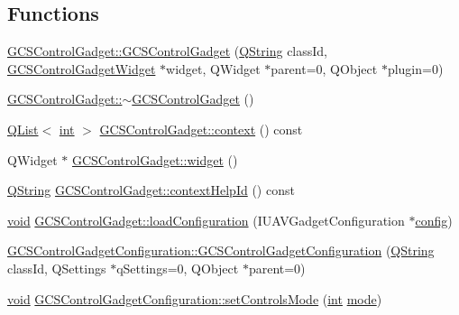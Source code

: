 \subsection*{Functions}
\begin{DoxyCompactItemize}
\item 
\hyperlink{group___g_c_s_control_gadget_plugin_gaa2bb4808899771140d27bd47b54ccb8c}{G\-C\-S\-Control\-Gadget\-::\-G\-C\-S\-Control\-Gadget} (\hyperlink{group___u_a_v_objects_plugin_gab9d252f49c333c94a72f97ce3105a32d}{Q\-String} class\-Id, \hyperlink{class_g_c_s_control_gadget_widget}{G\-C\-S\-Control\-Gadget\-Widget} $\ast$widget, Q\-Widget $\ast$parent=0, Q\-Object $\ast$plugin=0)
\item 
\hyperlink{group___g_c_s_control_gadget_plugin_ga109d324fea74699d89e95ea779cd7c18}{G\-C\-S\-Control\-Gadget\-::$\sim$\-G\-C\-S\-Control\-Gadget} ()
\item 
\hyperlink{class_q_list}{Q\-List}$<$ \hyperlink{ioapi_8h_a787fa3cf048117ba7123753c1e74fcd6}{int} $>$ \hyperlink{group___g_c_s_control_gadget_plugin_gaebdfdbcaa43f61addf35752163d359d7}{G\-C\-S\-Control\-Gadget\-::context} () const 
\item 
Q\-Widget $\ast$ \hyperlink{group___g_c_s_control_gadget_plugin_ga36c99e15ded265f21ddeb3b0ef9a344f}{G\-C\-S\-Control\-Gadget\-::widget} ()
\item 
\hyperlink{group___u_a_v_objects_plugin_gab9d252f49c333c94a72f97ce3105a32d}{Q\-String} \hyperlink{group___g_c_s_control_gadget_plugin_ga5be6c84c2994367f7f86e3553cf68b19}{G\-C\-S\-Control\-Gadget\-::context\-Help\-Id} () const 
\item 
\hyperlink{group___u_a_v_objects_plugin_ga444cf2ff3f0ecbe028adce838d373f5c}{void} \hyperlink{group___g_c_s_control_gadget_plugin_ga439722d2b4016bbfaad9486b20c35a1a}{G\-C\-S\-Control\-Gadget\-::load\-Configuration} (I\-U\-A\-V\-Gadget\-Configuration $\ast$\hyperlink{deflate_8c_a4473b5227787415097004fd39f55185e}{config})
\item 
\hyperlink{group___g_c_s_control_gadget_plugin_ga564a596fece84d06f7a2ff0f9151d140}{G\-C\-S\-Control\-Gadget\-Configuration\-::\-G\-C\-S\-Control\-Gadget\-Configuration} (\hyperlink{group___u_a_v_objects_plugin_gab9d252f49c333c94a72f97ce3105a32d}{Q\-String} class\-Id, Q\-Settings $\ast$q\-Settings=0, Q\-Object $\ast$parent=0)
\item 
\hyperlink{group___u_a_v_objects_plugin_ga444cf2ff3f0ecbe028adce838d373f5c}{void} \hyperlink{group___g_c_s_control_gadget_plugin_gaa1642ff7af92b8b9805e2f4ec1e55e05}{G\-C\-S\-Control\-Gadget\-Configuration\-::set\-Controls\-Mode} (\hyperlink{ioapi_8h_a787fa3cf048117ba7123753c1e74fcd6}{int} \hyperlink{glext_8h_a1e71d9c196e4683cc06c4b54d53f7ef5}{mode})

\end{DoxyCompactItemize}
